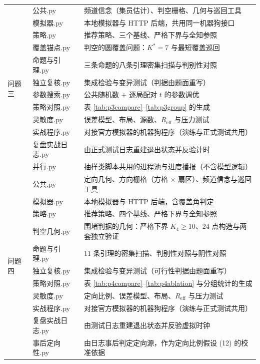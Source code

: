 \documentclass[withoutpreface, bwprint]{cumcmthesis}
\begin{document}
\begin{appendices}
\begin{longtable}{llp{6.6cm}}
    \multirow{12}{*}{问题三}
      & 公共.py & 频道信念（集员估计）、判空栅格、几何与巡回工具 \\
      & 模拟器.py & 本地模拟器与 HTTP 后端，共用同一机器狗接口 \\
      & 策略.py & 推荐策略、三个基线、严格下界与全知参照 \\
      & 覆盖锚点.py & 判空的圆覆盖问题：$K^{*}=7$ 与最短覆盖巡回 \\
      & 命题与引理.py & 三条命题的八条引理密集扫描与判别性对照 \\
      & 独立复核.py & 集成检验与变异测试（判据由题面重写） \\
      & 参数搜索.py & 公共随机数 $+$ 逐局配对 $t$ 的参数调优 \\
      & 策略对照.py & 表 \ref{tab:p3compare}--\ref{tab:p3group} 的生成 \\
      & 灵敏度.py & 误差模型、布局、源数、$R_{\mathrm{eff}}$ 与压力测试 \\
      & 实战程序.py & 对接官方模拟器的机器狗程序（演练与正式测试共用） \\
      & 复盘实战日志.py & 由正式测试日志重建退出状态并反验计时 \\
      & 并行.py & 抽样类脚本共用的进程池与进度播报（不含模型逻辑） \\
    \midrule
    \multirow{13}{*}{问题四}
      & 公共.py & 定向几何、方向栅格（方格 $\times$ 扇区）、频道信念与巡回工具 \\
      & 模拟器.py & 本地模拟器与 HTTP 后端，含覆盖角判定 \\
      & 策略.py & 推荐策略、四个基线、严格下界与全知参照 \\
      & 判空几何.py & 围堵判据的几何：严格下界 $K_4\ge 10$、$24$ 点构造与两套独立验证 \\
      & 命题与引理.py & $11$ 条引理的密集扫描、判别性对照与阴性对照 \\
      & 独立复核.py & 集成检验与变异测试（可行性判据由题面重写） \\
      & 策略对照.py & 表 \ref{tab:p4compare}--\ref{tab:p4ablation} 与分组统计的生成 \\
      & 灵敏度.py & 定向比例、误差模型、布局、$R_{\mathrm{eff}}$ 与压力测试 \\
      & 实战程序.py & 对接官方模拟器的机器狗程序（演练与正式测试共用） \\
      & 复盘实战日志.py & 由测试日志重建退出状态并反验虚拟时钟 \\
      & 事后定向性.py & 由日志事后判定定向源，作为定向比例假设 (12) 的校准依据 \\

\end{longtable}
\end{appendices}
\end{document}
